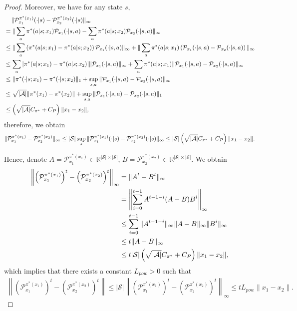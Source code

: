 \documentclass{article}
\theoremstyle{plain}
\theoremstyle{definition}
\theoremstyle{remark}
\def\R{\mathbb R}
\def\cA{\mathcal A}
\def\cP{\mathcal P}
\def\cS{\mathcal S}
\begin{document}
\begin{proof}
    Moreover, we have for any state $s$, 
    \begin{align}
        & \quad \,  \| \cP^{\pi^*(x_1)}_{x_1}(\cdot| s) - \cP^{\pi^*(x_2)}_{x_2}(\cdot| s) \|_\infty \nonumber \\
        & = \|\sum_{a}  \pi^*(a|s;x_1) \cP_{x_1}(\cdot| s,a ) - \sum_{a} \pi^*(a|s;x_2) \cP_{x_2}(\cdot| s,a ) \|_\infty \notag\\
        & \leq \| \sum_{a} \left(  \pi^*(a|s;x_1)  - \pi^*(a|s;x_2)\right)\cP_{x_1}(\cdot| s,a )  \|_\infty + \| \sum_{a}  \pi^*(a|s;x_1)\left(  \cP_{x_1}(\cdot| s,a ) - \cP_{x_2}(\cdot| s,a ) \right) \|_\infty \notag\\
        & \leq \sum_{a} | \pi^*(a|s;x_1)  - \pi^*(a|s;x_2) |\| \cP_{x_1}(\cdot| s,a )\|_\infty + \sum_{a}  \pi^*(a|s;x_1) \|  \cP_{x_1}(\cdot| s,a ) - \cP_{x_2}(\cdot| s,a ) \|_\infty \notag\\
        & \leq  \| \pi^*(\cdot|s;x_1) - \pi^*(\cdot|s;x_2) \|_1 + \sup_{s,a} \|  \cP_{x_1}(\cdot| s,a ) - \cP_{x_2}(\cdot| s,a ) \|_\infty \notag \\
        & \leq  \sqrt{|\cA|}\| \pi^*(x_1) - \pi^*(x_2) \| + \sup_{s,a} \|  \cP_{x_1}(\cdot| s,a ) - \cP_{x_2}(\cdot| s,a ) \|_1 \notag \\
        & \leq \left(\sqrt{|\cA|}  C_{\pi^*} + C_P\right) \| x_1 - x_2 \|  ,
    \end{align}
    therefore, we obtain
    \begin{align}
        \|\cP^{\pi^*(x_1)}_{x_1} - \cP^{\pi^*(x_2)}_{x_2}\|_\infty  \leq |\cS| \sup_{s} \| \cP^{\pi^*(x_1)}_{x_1}(\cdot| s) - \cP^{\pi^*(x_2)}_{x_2}(\cdot| s) \|_\infty \leq |\cS| \left(\sqrt{|\cA|}  C_{\pi^*} + C_P\right) \| x_1 - x_2 \| \notag.
    \end{align}

    Hence, denote $A = \cP^{\pi^*(x_1)}_{x_1} \in \R^{|\cS| \times |\cS|}$, $B = \cP^{\pi^*(x_2)}_{x_2}\in \R^{|\cS| \times |\cS|} $. We obtain
    \begin{align}
       \left\|\left(\cP^{\pi^*(x_1)}_{x_1}\right)^t - \left(\cP^{\pi^*(x_2)}_{x_2} \right)^t \right\|_{\infty} & = \|A^t - B^t \|_\infty \notag \\
        & = \left\|\sum_{i=0}^{t-1} A^{t-1-i}(A - B)B^i \right\|_\infty \notag \\
        & \leq \sum_{i=0}^{t-1} \|A^{t-1-i}\|_\infty \|A - B\|_\infty \|B^i\|_\infty \notag \\
        & \leq t \| A - B\|_\infty \notag \\
        & \leq t |\cS| \left(\sqrt{|\cA|}  C_{\pi^*} + C_P\right) \| x_1 - x_2 \|,
    \end{align}
    which implies that there exists a constant $L_{pow}>0$ such that
    \begin{align}
        \left\|\left(\cP^{\pi^*(x_1)}_{x_1}\right)^t - \left(\cP^{\pi^*(x_2)}_{x_2} \right)^t \right\| \leq|\cS| \left\|\left(\cP^{\pi^*(x_1)}_{x_1}\right)^t - \left(\cP^{\pi^*(x_2)}_{x_2} \right)^t \right\|_\infty \leq  t L_{pow} \| x_1 - x_2 \|.
    \end{align}


\end{proof}
\end{document}
